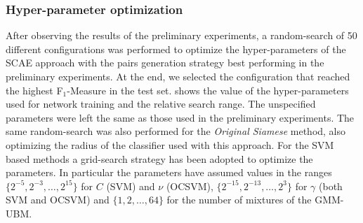 \subsubsection{Hyper-parameter optimization}
\label{sec:opt_results}
After observing the results of the preliminary experiments, a random-search of 50 different configurations was performed to optimize the hyper-parameters of the SCAE approach with the pairs generation strategy best performing in the preliminary experiments. At the end, we selected the configuration that reached the highest F$_1$-Measure in the test set.  shows the value of the hyper-parameters used for network training and the relative search range. The unspecified parameters were left the same as those used in the preliminary experiments. The same random-search was also performed for the \textit{Original Siamese} method, also optimizing the radius of the classifier used with this approach. For the SVM based methods a grid-search strategy has been adopted to optimize the parameters. In particular the parameters have assumed values in the ranges  $\{ 2^{-5},2^{-3},\ldots,2^{15} \}$ for $ C $ (SVM) and $ \nu $ (OCSVM), $\{ 2^{-15},2^{-13},\ldots,2^{3} \}$ for $ \gamma $ (both SVM and OCSVM) and  $\{1,2,\ldots,64 \}$ for the number of mixtures of the GMM-UBM. 


